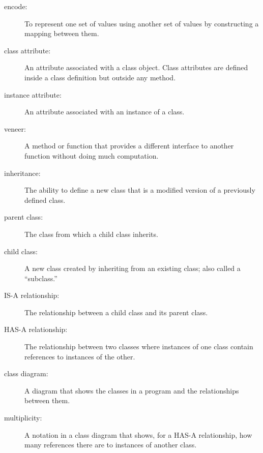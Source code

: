 \documentclass[10pt]{book}
\begin{document}
\begin{description}

\item[encode:]  To represent one set of values using another
set of values by constructing a mapping between them.

\item[class attribute:] An attribute associated with a class
object.  Class attributes are defined inside
a class definition but outside any method.

\item[instance attribute:] An attribute associated with an
instance of a class.

\item[veneer:] A method or function that provides a different
interface to another function without doing much computation.

\item[inheritance:] The ability to define a new class that is a
modified version of a previously defined class.

\item[parent class:] The class from which a child class inherits.

\item[child class:] A new class created by inheriting from an
existing class; also called a ``subclass.''

\item[IS-A relationship:] The relationship between a child class
and its parent class.

\item[HAS-A relationship:] The relationship between two classes
where instances of one class contain references to instances of
the other.

\item[class diagram:] A diagram that shows the classes in a program
and the relationships between them.

\item[multiplicity:] A notation in a class diagram that shows, for
a HAS-A relationship, how many references there are to instances
of another class.

\end{description}
\end{document}
